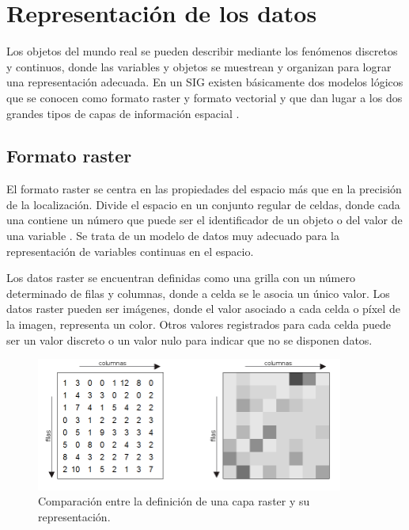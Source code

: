 \section{Representación de los datos }
\label{sec:cap2-tecnicas-graficas-representacion}
Los objetos del mundo real se pueden describir mediante los fenómenos discretos y continuos, donde las variables y objetos se muestrean y organizan para lograr una representación adecuada. En un
SIG existen básicamente dos modelos lógicos que se conocen como formato raster y formato vectorial
y que dan lugar a los dos grandes tipos de capas de información espacial \cite{fAlonsoSig2006}.

\subsection{Formato raster}
El formato raster se centra en las propiedades del espacio más que en la precisión de la
localización. Divide el espacio en un conjunto regular de celdas, donde cada una contiene un
número que puede ser el identificador de un objeto o del valor de una variable
\cite{fAlonsoSig2006}. Se trata de un modelo de datos muy adecuado para la representación de
variables continuas en el espacio.

Los datos raster se encuentran definidas como una grilla con un número determinado de filas y
columnas, donde a celda se le asocia un único valor. Los datos raster pueden ser imágenes, donde
el valor asociado a cada celda o píxel de la imagen, representa un color. Otros valores
registrados para cada celda puede ser un valor discreto o un valor nulo para indicar que no se
disponen datos.

\begin{figure}[H]
\centering
\includegraphics[width=0.9\textwidth]{capitulo-2/graphics/representacion-raster.png}
\caption{\label{fig:sig-capa-raster} Comparación entre la definición de una capa raster y su representación. }
\end{figure}

